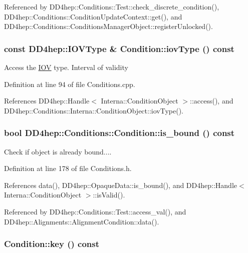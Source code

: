 Referenced by DD4hep::Conditions::Test::check\_\-discrete\_\-condition(), DD4hep::Conditions::ConditionUpdateContext::get(), and DD4hep::Conditions::ConditionsManagerObject::registerUnlocked().\hypertarget{class_d_d4hep_1_1_conditions_1_1_condition_a855588ac1eb5fea843808c0fce5dd3aa}{
\subsubsection[{iovType}]{\setlength{\rightskip}{0pt plus 5cm}const {\bf DD4hep::IOVType} \& Condition::iovType () const}}
\label{class_d_d4hep_1_1_conditions_1_1_condition_a855588ac1eb5fea843808c0fce5dd3aa}


Access the \hyperlink{class_d_d4hep_1_1_i_o_v}{IOV} type. Interval of validity 

Definition at line 94 of file Conditions.cpp.

References DD4hep::Handle$<$ Interna::ConditionObject $>$::access(), and DD4hep::Conditions::Interna::ConditionObject::iovType().\hypertarget{class_d_d4hep_1_1_conditions_1_1_condition_adddcbf402cb3e6fc31aebc933045da88}{
\subsubsection[{is\_\-bound}]{\setlength{\rightskip}{0pt plus 5cm}bool DD4hep::Conditions::Condition::is\_\-bound () const}}
\label{class_d_d4hep_1_1_conditions_1_1_condition_adddcbf402cb3e6fc31aebc933045da88}


Check if object is already bound.... 

Definition at line 178 of file Conditions.h.

References data(), DD4hep::OpaqueData::is\_\-bound(), and DD4hep::Handle$<$ Interna::ConditionObject $>$::isValid().

Referenced by DD4hep::Conditions::Test::access\_\-val(), and DD4hep::Alignments::AlignmentCondition::data().\hypertarget{class_d_d4hep_1_1_conditions_1_1_condition_a38db941b4934fbb36ebb7eade86593a8}{
\subsubsection[{key}]{ Condition::key () const}}
\label{class_d_d4hep_1_1_conditions_1_1_condition_a38db941b4934fbb36ebb7eade86593a8}


